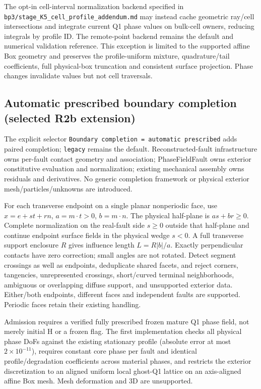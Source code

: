 \documentclass[11pt]{article}
\begin{document}
The opt-in cell-interval normalization backend specified in
\texttt{bp3/stage\_K5\_cell\_profile\_addendum.md} may instead cache geometric
ray/cell intersections and integrate current Q1 phase values on bulk-cell
owners, reducing integrals by profile ID. The remote-point backend remains the
default and numerical validation reference. This exception is limited to the
supported affine Box geometry and preserves the profile-uniform mixture,
quadrature/tail coefficients, full physical-box truncation and consistent
surface projection. Phase changes invalidate values but not cell traversals.

\subsection{Automatic prescribed boundary completion (selected R2b extension)}
The explicit selector \texttt{Boundary completion = automatic prescribed}
adds paired completion; \texttt{legacy} remains the default. Reconstructed-fault
infrastructure owns per-fault contact geometry and association; PhaseFieldFault
owns exterior constitutive evaluation and normalization; existing mechanical
assembly owns residuals and derivatives. No generic completion framework or
physical exterior mesh/particles/unknowns are introduced.

For each transverse endpoint on a single planar nonperiodic face, use
$x=e+s t+r n$, $a=m\cdot t>0$, $b=m\cdot n$. The physical half-plane is
$as+br\geq0$. Complete normalization on the real-fault side $s\geq0$ outside
that half-plane and continue endpoint surface fields in the physical wedge
$s<0$. A full transverse support enclosure $R$ gives influence length
$L=R|b|/a$. Exactly perpendicular contacts have zero correction; small angles
are not rotated. Detect segment crossings as well as endpoints, deduplicate
shared facets, and reject corners, tangencies, unrepresented crossings,
short/curved terminal neighborhoods, ambiguous or overlapping diffuse support,
and unsupported exterior data. Either/both endpoints, different faces and
independent faults are supported. Periodic faces retain their existing handling.

Admission requires a verified fully prescribed frozen mature Q1 phase field,
not merely initial H or a frozen flag. The first implementation checks all
physical phase DoFs against the existing stationary profile (absolute error
at most $2\times10^{-11}$), requires constant core phase per fault and identical
profile/degradation coefficients across material phases, and restricts the
exterior discretization to an aligned uniform local ghost-Q1 lattice on an
axis-aligned affine Box mesh. Mesh deformation and 3D are unsupported.
\end{document}
